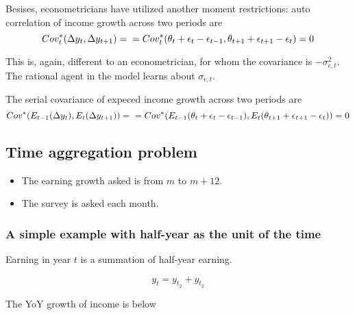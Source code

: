 \documentclass[12pt,notitlepage,onecolumn,aps,pra]{revtex4-1}
\providecommand{\tightlist}{%
      \setlength{\itemsep}{0pt}\setlength{\parskip}{0pt}}
\begin{document}
Besises, econometricians have utilized another moment restrictions: auto
correlation of income growth across two periods are \begin{equation}
Cov^*_{t}( \Delta y_t, \Delta y_{t+1} ) = \\
 = Cov^*_{t}(\theta_t + \epsilon_t - \epsilon_{t-1}, \theta_{t+1} + \epsilon_{t+1} - \epsilon_{t}) \\
 = 0 
\end{equation}

This is, again, different to an econometrician, for whom the covariance
is \(-\sigma^2_{\epsilon,t}\). The rational agent in the model learns
about \(\sigma_{\epsilon,t}\).

The serial covariance of expeced income growth across two periods are
\begin{equation}
Cov^*( E_{t-1}(\Delta y_t), E_t(\Delta y_{t+1}) ) = \\
= Cov^*(E_{t-1}(\theta_t +\epsilon_t - \epsilon_{t-1}), E_{t}(\theta_{t+1} + \epsilon_{t+1} - \epsilon_t)) \\
= 0
\end{equation}

    \hypertarget{time-aggregation-problem}{%
\subsection{Time aggregation problem}\label{time-aggregation-problem}}

\begin{itemize}
\tightlist
\item
  The earning growth asked is from \(m\) to \(m+12\).
\item
  The survey is asked each month.
\end{itemize}

    \hypertarget{a-simple-example-with-half-year-as-the-unit-of-the-time}{%
\subsubsection{A simple example with half-year as the unit of the
time}\label{a-simple-example-with-half-year-as-the-unit-of-the-time}}

Earning in year \(t\) is a summation of half-year earning.

\begin{equation}
y_t = y_{t_2}+ y_{t_2} 
\end{equation}

The YoY growth of income is below
\end{document}
